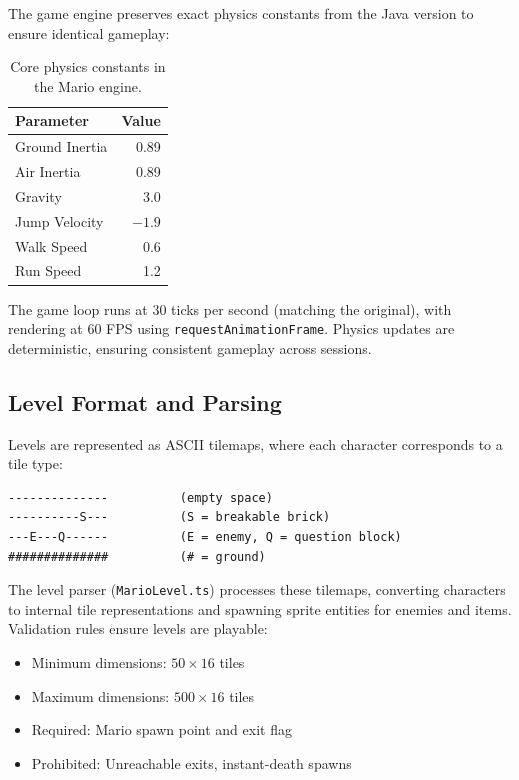 \documentclass[11pt,a4paper]{article}
\theoremstyle{plain}
\theoremstyle{definition}
\theoremstyle{remark}
\begin{document}
The game engine preserves exact physics constants from the Java version to ensure identical gameplay:

\begin{table}[H]
\centering
\begin{tabular}{lr}
\toprule
\textbf{Parameter} & \textbf{Value} \\
\midrule
Ground Inertia & 0.89 \\
Air Inertia & 0.89 \\
Gravity & 3.0 \\
Jump Velocity & $-1.9$ \\
Walk Speed & 0.6 \\
Run Speed & 1.2 \\
\bottomrule
\end{tabular}
\caption{Core physics constants in the Mario engine.}
\label{tab:physics}
\end{table}

The game loop runs at 30 ticks per second (matching the original), with rendering at 60 FPS using \texttt{requestAnimationFrame}. Physics updates are deterministic, ensuring consistent gameplay across sessions.

\subsection{Level Format and Parsing}
\label{subsec:level-format}

Levels are represented as ASCII tilemaps, where each character corresponds to a tile type:

\begin{lstlisting}
--------------          (empty space)
----------S---          (S = breakable brick)
---E---Q------          (E = enemy, Q = question block)
##############          (# = ground)
\end{lstlisting}

The level parser (\texttt{MarioLevel.ts}) processes these tilemaps, converting characters to internal tile representations and spawning sprite entities for enemies and items. Validation rules ensure levels are playable:

\begin{itemize}
    \item Minimum dimensions: $50 \times 16$ tiles
    \item Maximum dimensions: $500 \times 16$ tiles
    \item Required: Mario spawn point and exit flag
    \item Prohibited: Unreachable exits, instant-death spawns
\end{itemize}
\end{document}
